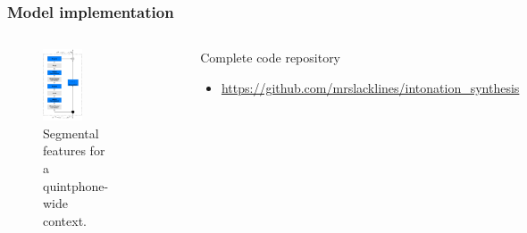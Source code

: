 \documentclass[a4paper,9pt]{beamer}
\theoremstyle{mytheoremstyle}
\begin{document}
\begin{frame}
\frametitle{Model implementation}
\begin{columns}
\begin{figure}
\begin{center}
  \includegraphics[width=0.6\textwidth]{res/residual_block}
\end{center}
\caption{Segmental features for a quintphone-wide context.}
\end{figure}
\begin{center}
\includegraphics[width=2cm]{res/implementation_framework}
\end{center}
\hrule
\begin{exampleblock}{Complete code repository}
\begin{itemize}
\item[\checkmark] \scriptsize{\url{https://github.com/mrslacklines/intonation_synthesis}}
\end{itemize}
\end{exampleblock}
\end{columns}
\end{frame}
\end{document}
